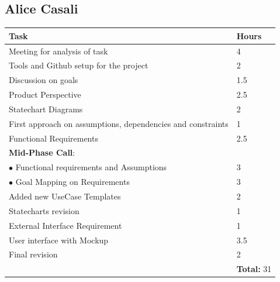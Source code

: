 \documentclass{report}
\begin{document}
\subsection*{Alice Casali}
\begin{table}[!ht]
	\begin{tabular}{|C{.60\textwidth}||C{.20\textwidth}|}
		\toprule
		\textbf{Task} & \textbf{Hours}\\
		\midrule
		\midrule
		Meeting for analysis of task & 4\\
		\midrule
		Tools and Github setup for the project & 2\\
		\midrule
		Discussion on goals & 1.5\\
		\midrule
		Product Perspective & 2.5\\ 
		\midrule
		Statechart Diagrams & 2\\
		\midrule
		First approach on assumptions, dependencies and constraints & 1\\
		\midrule
		Functional Requirements & 2.5\\ 
		\midrule
		\small{\textbf{Mid-Phase Call}}: & \\
		\vspace{.2mm}
		$\bullet$ Functional requirements and Assumptions & \vspace{.2mm} 3\\
		$\bullet$ Goal Mapping on Requirements & 3\\
		\midrule
		Added new UseCase Templates & 2 \\
		\midrule
		Statecharts revision & 1\\
		\midrule
		External Interface Requirement & 1\\
		\midrule
		User interface with Mockup & 3.5\\
		\midrule
		Final revision & 2\\
		& \textbf{Total:} 31\\
		\bottomrule
	\end{tabular}
\end{table}
\end{document}
